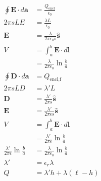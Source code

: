 \documentclass{article}
\renewcommand{\vec}[1]{\boldsymbol{\mathbf{#1}}}
\newcommand{\uvec}[1]{\hat{\vec{#1}}}
\begin{document}
\subsection{}

\begin{align*}
  \oint \vec{E} \cdot d \vec{a}                   & = \frac{Q_\text{encl}}{\epsilon_0}                                       \\
  2 \pi s L E                                     & = \frac{\lambda L}{\epsilon_0}                                           \\
  \vec{E}                                         & = \frac{\lambda}{2 \pi \epsilon_0 s} \uvec{s}                            \\
  V                                               & = \int_a^b \vec{E} \cdot d \vec{l}                                       \\
                                                  & = \frac{\lambda}{2 \pi \epsilon_0} \ln \frac{b}{a}                       \\
  \oint \vec{D} \cdot d \vec{a}                   & = Q_\text{encl,f}                                                        \\
  2 \pi s L D                                     & = \lambda' L                                                             \\
  \vec{D}                                         & = \frac{\lambda'}{2 \pi s} \uvec{s}                                      \\
  \vec{E}                                         & = \frac{\lambda'}{2 \pi \epsilon s} \uvec{s}                             \\
  V                                               & = \int_a^b \vec{E} \cdot d \vec{l}                                       \\
                                                  & = \frac{\lambda'}{2 \pi \epsilon} \ln \frac{b}{a}                        \\
  \frac{\lambda'}{2 \pi \epsilon} \ln \frac{b}{a} & = \frac{\lambda}{2 \pi \epsilon_0} \ln \frac{b}{a}                       \\
  \lambda'                                        & = \epsilon_r \lambda                                                     \\
  Q                                               & = \lambda' h + \lambda (\ell - h)                                        \\

\end{align*}
\end{document}
